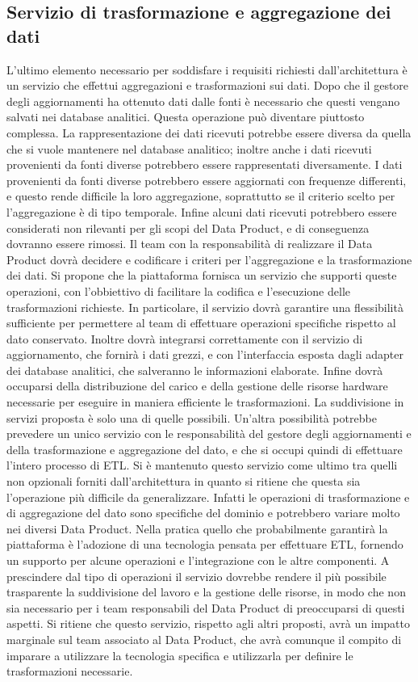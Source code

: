 \documentclass[12pt]{report}
\begin{document}
\subsection{Servizio di trasformazione e aggregazione dei dati}
L'ultimo elemento necessario per soddisfare i requisiti richiesti dall'architettura è un servizio che effettui aggregazioni e trasformazioni sui dati.
Dopo che il gestore degli aggiornamenti ha ottenuto dati dalle fonti è necessario che questi vengano salvati nei database analitici.
Questa operazione può diventare piuttosto complessa.
La rappresentazione dei dati ricevuti potrebbe essere diversa da quella che si vuole mantenere nel database analitico; inoltre anche i dati ricevuti provenienti da fonti diverse potrebbero essere rappresentati diversamente.
I dati provenienti da fonti diverse potrebbero essere aggiornati con frequenze differenti, e questo rende difficile la loro aggregazione, soprattutto se il criterio scelto per l'aggregazione è di tipo temporale.
Infine alcuni dati ricevuti potrebbero essere considerati non rilevanti per gli scopi del Data Product, e di conseguenza dovranno essere rimossi.
Il team con la responsabilità di realizzare il Data Product dovrà decidere e codificare i criteri per l'aggregazione e la trasformazione dei dati.
Si propone che la piattaforma fornisca un servizio che supporti queste operazioni, con l'obbiettivo di facilitare la codifica e l'esecuzione delle trasformazioni richieste.
In particolare, il servizio dovrà garantire una flessibilità sufficiente per permettere al team di effettuare operazioni specifiche rispetto al dato conservato.
Inoltre dovrà integrarsi correttamente con il servizio di aggiornamento, che fornirà i dati grezzi, e con l'interfaccia esposta dagli adapter dei database analitici, che salveranno le informazioni elaborate.
Infine dovrà occuparsi della distribuzione del carico e della gestione delle risorse hardware necessarie per eseguire in maniera efficiente le trasformazioni. 
La suddivisione in servizi proposta è solo una di quelle possibili. 
Un'altra possibilità potrebbe prevedere un unico servizio con le responsabilità del gestore degli aggiornamenti e della  trasformazione e aggregazione del dato, e che si occupi quindi di effettuare l'intero processo di ETL.
Si è mantenuto questo servizio come ultimo tra quelli non opzionali forniti dall'architettura in quanto si ritiene che questa sia l'operazione più difficile da generalizzare.
Infatti le operazioni di trasformazione e di aggregazione del dato sono specifiche del dominio e potrebbero variare molto nei diversi Data Product.
Nella pratica quello che probabilmente garantirà la piattaforma è l'adozione di una tecnologia pensata per effettuare ETL, fornendo un supporto per alcune operazioni e l'integrazione con le altre componenti.
A prescindere dal tipo di operazioni il servizio dovrebbe rendere il più possibile trasparente la suddivisione del lavoro e la gestione delle risorse, in modo che non sia necessario per i team responsabili del Data Product di preoccuparsi di questi aspetti.
Si ritiene che questo servizio, rispetto agli altri proposti, avrà un impatto marginale sul team associato al Data Product, che avrà comunque il compito di imparare a utilizzare la tecnologia specifica e utilizzarla per definire le trasformazioni necessarie.
\end{document}
